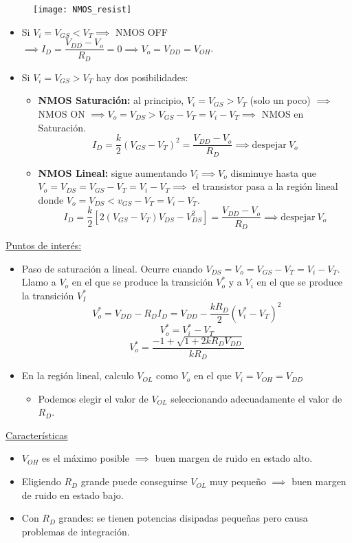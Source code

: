 \documentclass[10pt,a4paper]{article}
\begin{document}
	\begin{figure}[h]
		\centering
		\texttt{[image: NMOS\_resist]}
	\end{figure}
	\begin{itemize}
		\item Si $V_i = V_{GS} < V_T \implies$ NMOS OFF $\implies I_D = \dfrac{V_{DD} - V_o}{R_D} = 0 \implies V_o = V_{DD} = V_{OH}$.
		\item Si $V_i = V_{GS} > V_T$ hay dos posibilidades:
		\begin{itemize}
			\item \textbf{NMOS Saturación: }al principio, $V_i = V_{GS} > V_T$ (solo un poco) $\implies$ NMOS ON $\implies V_o = V_{DS} > V_{GS} - V_T = V_i - V_T \implies$ NMOS en Saturación.
			$$I_D = \dfrac{k}{2}(V_{GS} - V_T)^2 = \dfrac{V_{DD} - V_o}{R_D} \implies \text{despejar} ~ V_o$$
			\item \textbf{NMOS Lineal: }sigue aumentando $V_i \implies V_o$ disminuye hasta que $V_o = V_{DS} = V_{GS} - V_T = V_i - V_T \implies$ el transistor pasa a la región lineal donde $V_o = V_{DS} < v_{GS} - V_T = V_i - V_T$.
			$$I_D = \dfrac{k}{2}[2(V_{GS} - V_T)V_{DS} - V_{DS}^2] = \dfrac{V_{DD} - V_o}{R_D} \implies \text{despejar} ~ V_o$$
		\end{itemize}
	\end{itemize}
	
	\underline{Puntos de interés:}
	\begin{itemize}
		\item Paso de saturación a lineal. Ocurre cuando $V_{DS} = V_o = V_{GS} - V_T = V_i - V_T$. Llamo a $V_o$ en el que se produce la transición $V_o^*$ y a $V_i$ en el que se produce la transición $V_I^*$
		$$V_o^* = V_{DD} - R_D I_D = V_{DD} - \dfrac{k R_D}{2} (V_i^* - V_T) ^2$$
		$$V_o^* = V_i^* - V_T$$
		$$V_o^* = \dfrac{-1 + \sqrt{1 + 2k R_D V_{DD}}}{kR_D}$$
		\item En la región lineal, calculo $V_{OL}$ como $V_o$ en el que $V_i = V_{OH} = V_{DD}$
		\begin{itemize}
			\item Podemos elegir el valor de $V_{OL}$ seleccionando adecuadamente el valor de $R_D$.
		\end{itemize}
	\end{itemize}

	\underline{Características}
	
	\begin{itemize}
		\item $V_{OH}$ es el máximo posible $\implies$ buen margen de ruido en estado alto.
		\item Eligiendo $R_D$ grande puede conseguirse $V_{OL}$ muy pequeño $\implies$ buen margen de ruido en estado bajo.
		\item Con $R_D$ grandes: se tienen potencias disipadas pequeñas pero causa problemas de integración.
	\end{itemize}
	
\end{document}
